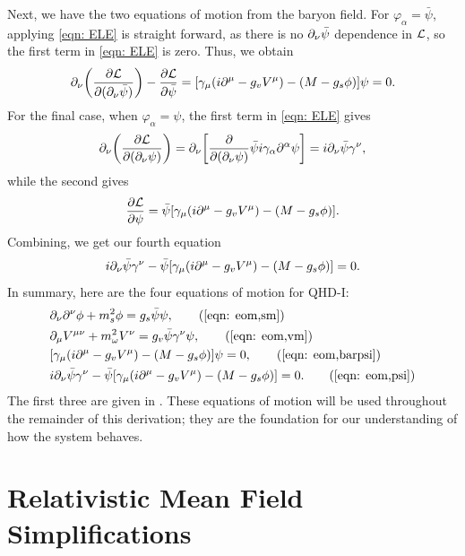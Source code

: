 Next, we have the two equations of motion from the baryon field. For $\varphi_\alpha = \bar\psi$, applying \eqref{eqn: ELE} is straight forward, as there is no $\partial_\nu \bar\psi$ dependence in $\mathcal{L}$, so the first term in \eqref{eqn: ELE} is zero. Thus, we obtain
\begin{align}\label{eqn: eom,barpsi}
    \p_\nu \pqty{\pdv{\Lag}{(\p_\nu \bar\psi)}}  - \pdv{\Lag}{\bar\psi} = \bqty{\gamma_\mu(i\p^\mu - g_v V^\mu) - (M-g_s\phi)} \psi = 0.
\end{align}
For the final case, when $\varphi_\alpha = \psi$, the first term in \eqref{eqn: ELE} gives
\begin{align*}
    \p_\nu \pqty{\pdv{\Lag}{(\p_\nu \psi)}} = \p_\nu\bqty{\pdv{}{(\p_\nu\psi)}\bar\psi i \gamma_\alpha \p^\alpha \psi} = i\p_\nu \bar\psi \gamma^\nu,
\end{align*}
while the second gives
\begin{align*}
    \pdv{\Lag}{\psi} = \bar\psi\bqty{\gamma_\mu(i\p^\mu - g_v V^\mu) - (M-g_s\phi)}.
\end{align*}
Combining, we get our fourth equation
\begin{align}\label{eqn: eom,psi}
    i \p_\nu \bar\psi \gamma^\nu -\bar\psi\bqty{\gamma_\mu(i\p^\mu - g_v V^\mu) - (M-g_s\phi)} = 0.
\end{align}
In summary, here are the four equations of motion for QHD-I:
\begin{align*}
    &\p_\nu \p^\nu \phi + m_s^2\phi = g_s\bar{\psi}\psi,\tag{\ref{eqn: eom,sm}}\\
    &\p_\mu V^{\mu\nu} + m_\omega^2 V^\nu = g_v \bar\psi \gamma^\nu \psi,\tag{\ref{eqn: eom,vm}}\\
    &\bqty{\gamma_\mu(i\p^\mu -g_v V^\mu) - (M-g_s\phi)} \psi = 0,\tag{\ref{eqn: eom,barpsi}}\\
    & i \p_\nu \bar\psi \gamma^\nu -\bar\psi\bqty{\gamma_\mu(i\p^\mu - g_v V^\mu) - (M-g_s\phi)} = 0. \tag{\ref{eqn: eom,psi}}
\end{align*}
The first three are given in \autocite{diener_2008}. These equations of motion will be used throughout the remainder of this derivation; they are the foundation for our understanding of how the system behaves.

\section{Relativistic Mean Field Simplifications}\label{sec: qhd1, rmf}

